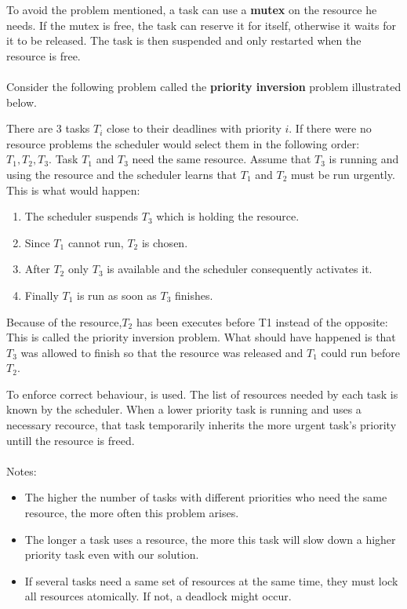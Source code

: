 To avoid the problem mentioned, a task can use a \textbf{mutex} on the resource he needs. If the mutex is free, the task can reserve it for itself, otherwise it waits for it to be released. The task is then suspended and only restarted when the resource is free.
\\\\
Consider the following problem called the \textbf{priority inversion} problem illustrated below.
\begin{exmp}
There are 3 tasks $T_i$ close to their deadlines with priority $i$. If there were no resource problems the scheduler would select them in the following order: $T_1, T_2, T_3$. Task $T_1$ and $T_3$ need the same resource. Assume that $T_3$ is running and using the resource and the scheduler learns that $T_1$ and $T_2$ must be run urgently. This is what would happen:
\begin{enumerate}
	\item The scheduler suspends $T_3$ which is holding the resource.
	\item Since $T_1$ cannot run, $T_2$ is chosen.
	\item After $T_2$ only $T_3$ is available and the scheduler consequently activates it.
	\item Finally $T_1$ is run as soon as $T_3$ finishes.
\end{enumerate} 
Because of the resource,$T_2$ has been executes before T1 instead of the opposite: This is called the priority inversion problem. What should have happened is that $T_3$ was allowed to finish so that the resource was released and $T_1$ could run before $T_2$.
\end{exmp}
To enforce correct behaviour,  is used. The list of resources needed by each task is known by the scheduler. When a lower priority task is running and uses a necessary recource, that task temporarily inherits the more urgent task's priority untill the resource is freed.
\\\\
Notes:
\begin{itemize}
	\item The higher the number of tasks with different priorities who need the same resource, the more often this problem arises. 
	\item The longer a task uses a resource, the more this task will slow down a higher priority task even with our solution.
	\item If several tasks need a same set of resources at the same time, they must lock all resources atomically. If not, a deadlock might occur.
\end{itemize}

